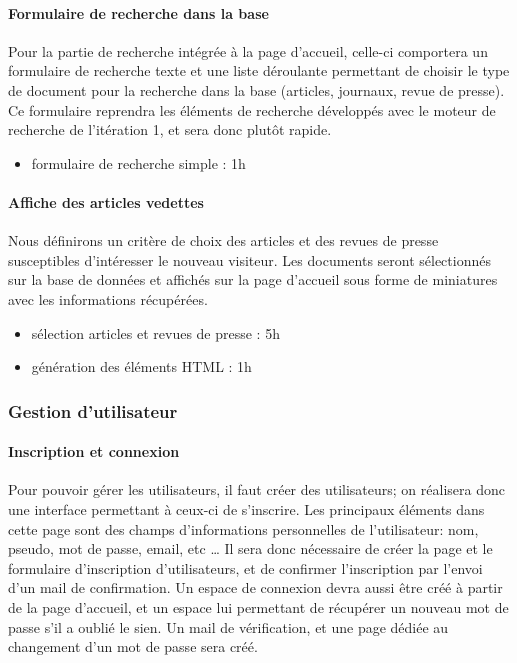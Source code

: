 		\paragraph{Formulaire de recherche dans la base}
			Pour la partie de recherche intégrée à la page d’accueil, celle-ci comportera un formulaire de recherche texte et une liste déroulante permettant de choisir le type de document pour la recherche dans la base (articles, journaux, revue de presse). Ce formulaire reprendra les éléments de recherche développés avec le moteur de recherche de l'itération 1, et sera donc plutôt rapide.

			\begin{itemize}
				\item formulaire de recherche simple : 1h
			\end{itemize}

		\paragraph{Affiche des articles vedettes} 
		\label{subsubsec:acc_article}
			Nous définirons un critère de choix des articles et des revues de presse susceptibles d'intéresser le nouveau visiteur. Les documents seront sélectionnés sur la base de données et affichés sur la page d'accueil sous forme de miniatures avec les informations récupérées.

			\begin{itemize}
				\item sélection articles et revues de presse : 5h
				\item génération des éléments HTML : 1h
			\end{itemize}

	\subsubsection{Gestion d'utilisateur}
	\label{subsubsec:utilisateur}
		\paragraph{Inscription et connexion}
			Pour pouvoir gérer les utilisateurs, il faut créer des utilisateurs; on réalisera donc une interface permettant à ceux-ci de s'inscrire. Les principaux éléments dans cette page sont des champs d’informations personnelles de l’utilisateur: nom, pseudo, mot de passe, email, etc … Il sera donc nécessaire de créer la page et le formulaire d'inscription d'utilisateurs, et de confirmer l'inscription par l'envoi d'un mail de confirmation. Un espace de connexion devra aussi être créé à partir de la page d'accueil, et un espace lui permettant de récupérer un nouveau mot de passe s'il a oublié le sien. Un mail de vérification, et une page dédiée au changement d'un mot de passe sera créé.

